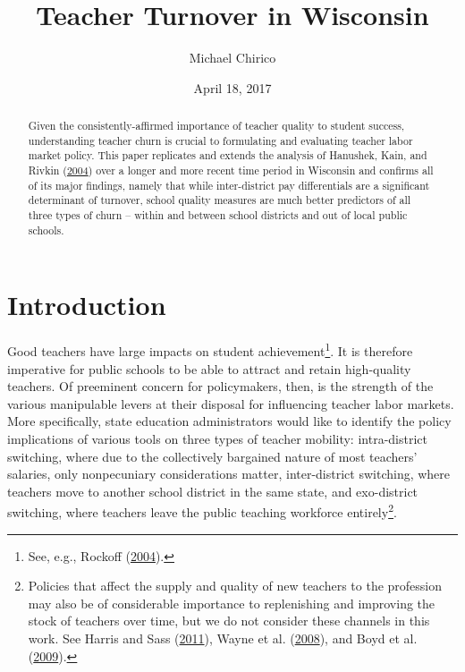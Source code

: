 \documentclass[12pt,]{article}
\title{Teacher Turnover in Wisconsin}
\author{Michael Chirico}
\date{April 18, 2017}
\let\rmarkdownfootnote\footnote%
\def\footnote{\protect\rmarkdownfootnote}
\begin{document}
\maketitle
\begin{abstract}
Given the consistently-affirmed importance of teacher quality to student
success, understanding teacher churn is crucial to formulating and
evaluating teacher labor market policy. This paper replicates and
extends the analysis of Hanushek, Kain, and Rivkin
(\protect\hyperlink{ref-hanushek}{2004}) over a longer and more recent
time period in Wisconsin and confirms all of its major findings, namely
that while inter-district pay differentials are a significant
determinant of turnover, school quality measures are much better
predictors of all three types of churn -- within and between school
districts and out of local public schools.
\end{abstract}

\section{Introduction}\label{introduction}

Good teachers have large impacts on student achievement\footnote{See,
  e.g., Rockoff (\protect\hyperlink{ref-rockoff}{2004}).}. It is
therefore imperative for public schools to be able to attract and retain
high-quality teachers. Of preeminent concern for policymakers, then, is
the strength of the various manipulable levers at their disposal for
influencing teacher labor markets. More specifically, state education
administrators would like to identify the policy implications of various
tools on three types of teacher mobility: intra-district switching,
where due to the collectively bargained nature of most teachers'
salaries, only nonpecuniary considerations matter, inter-district
switching, where teachers move to another school district in the same
state, and exo-district switching, where teachers leave the public
teaching workforce entirely\footnote{Policies that affect the supply and
  quality of new teachers to the profession may also be of considerable
  importance to replenishing and improving the stock of teachers over
  time, but we do not consider these channels in this work. See Harris
  and Sass (\protect\hyperlink{ref-harris}{2011}), Wayne et al.
  (\protect\hyperlink{ref-wayne}{2008}), and Boyd et al.
  (\protect\hyperlink{ref-boyd2009}{2009}).}.
\end{document}
